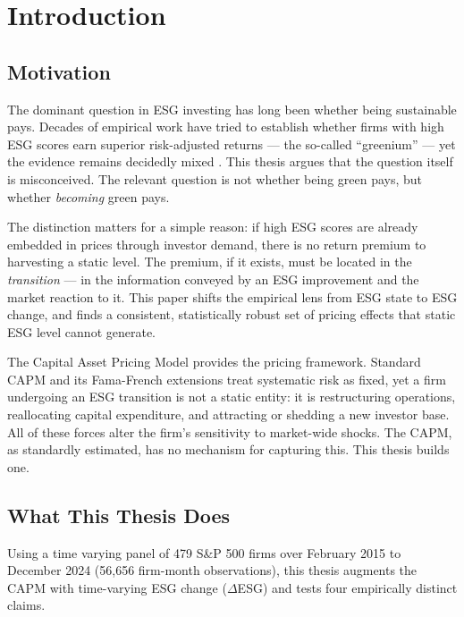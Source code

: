 \chapter{Introduction}
\label{chap:introduction}

\section{Motivation}

The dominant question in ESG investing has long been whether being sustainable pays. Decades of empirical work have tried to establish whether firms with high ESG scores earn superior risk-adjusted returns --- the so-called ``greenium'' --- yet the evidence remains decidedly mixed \citep{friede2015esg, berg2022aggregate}. This thesis argues that the question itself is misconceived. The relevant question is not whether being green pays, but whether \emph{becoming} green pays.

The distinction matters for a simple reason: if high ESG scores are already embedded in prices through investor demand, there is no return premium to harvesting a static level. The premium, if it exists, must be located in the \emph{transition} --- in the information conveyed by an ESG improvement and the market reaction to it. This paper shifts the empirical lens from ESG state to ESG change, and finds a consistent, statistically robust set of pricing effects that static ESG level cannot generate.

The Capital Asset Pricing Model provides the pricing framework. Standard CAPM and its Fama-French extensions treat systematic risk as fixed, yet a firm undergoing an ESG transition is not a static entity: it is restructuring operations, reallocating capital expenditure, and attracting or shedding a new investor base. All of these forces alter the firm's sensitivity to market-wide shocks. The CAPM, as standardly estimated, has no mechanism for capturing this. This thesis builds one.

\section{What This Thesis Does}

Using a time varying panel of 479 S\&P 500 firms over February 2015 to December 2024 (56,656 firm-month observations), this thesis augments the CAPM with time-varying ESG change ($\Delta$ESG) and tests four empirically distinct claims.

